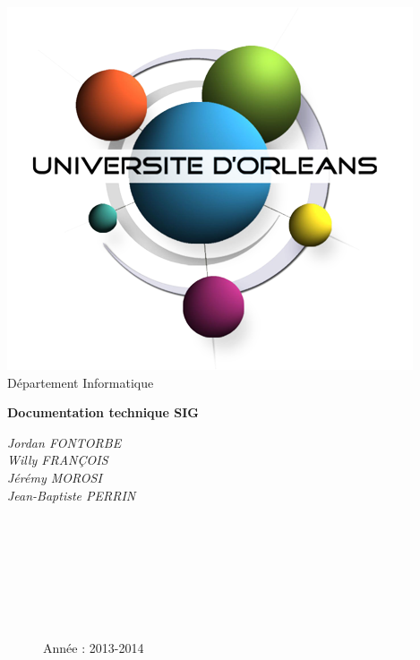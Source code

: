 \documentclass[12pt,a4paper,oneside]{article}
\begin{document}
\begin{titlepage}
\begin{flushright}
           \includegraphics[scale=0.30]{../images/univorleans.png}\\ 
                      Département Informatique
\end{flushright}
\vspace{30mm}
\begin{center}
\textbf{\huge{Documentation technique SIG }}\\
\vspace{8mm}
\begin{large}
	\textit{Jordan FONTORBE}\\
	\textit{Willy FRANÇOIS}\\
	\textit{Jérémy MOROSI}\\
	\textit{Jean-Baptiste PERRIN}
\end{large}

\end{center}
\begin{figure}[b!]
\begin{flushright}
~~\\ ~~\\ ~~\\ ~~\\ ~~\\ ~~\\ ~~\\
\large{Année : 2013-2014}
\end{flushright}
\end{figure}
\end{titlepage}
\end{document}
